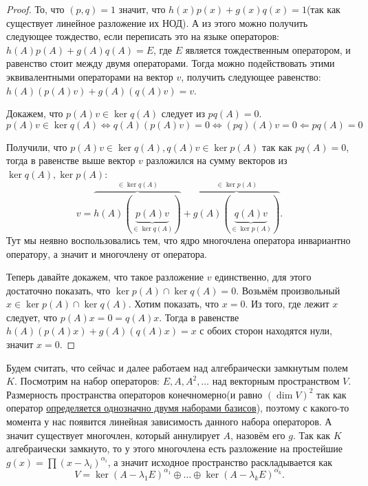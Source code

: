 \begin{proof}
    То, что $(p,q) = 1$ значит, что 
    $h(x)p(x) + g(x)q(x) = 1$(так как существует линейное разложение их НОД).
    А из этого можно получить следующее тождество, если переписать это на языке операторов:
    $h(A)p(A) + g(A) q(A) = E$, где $E$ является тождественным оператором, и равенство
    стоит между двумя операторами.
    Тогда можно подействовать этими эквивалентными операторами на вектор $v$, получить
    следующее равенство: $h(A)(p(A)v) + g(A)(q(A)v) = v$.

    Докажем, что $p(A)v\in \ker q(A)$ следует из $pq(A) = 0$.
    \[
        p(A)v\in \ker q(A) \Leftrightarrow q(A)(p(A)v) = 0 \Leftrightarrow (pq)(A)v = 0 \Leftarrow pq(A)=0
    \] 
    
    Получили, что $p(A)v\in \ker q(A), q(A)v\in \ker p(A)$ так как $pq(A)=0$,
    тогда в равенстве выше вектор $v$ разложился на сумму векторов из $\ker q(A), \ker p(A)$:
    \[
        v = 
        \overbrace{h(A)(\underbrace{p(A)v}_{\in \ker q(A)})}^{\in \ker q(A)} + 
        \overbrace{g(A)(\underbrace{q(A)v}_{\in \ker p(A)})}^{\in \ker p(A)}
    .\]
    Тут мы неявно
    воспользовались тем, что ядро многочлена оператора инвариантно оператору, а
    значит и многочлену от оператора.

    Теперь давайте докажем, что такое разложение $v$ единственно, для этого достаточно
    показать, что $\ker p(A) \cap \ker q(A) = 0$. Возьмём произвольный
    $x\in \ker p(A)\cap \ker q(A)$. Хотим показать, что $x = 0$.
    Из того, где лежит  $x$ следует, что $p(A)x = 0 = q(A)x$.
    Тогда в равенстве $h(A)(p(A)x) + g(A)(q(A)x) = x$ с обоих сторон находятся нули, 
    значит $x = 0$.
\end{proof}
Будем считать, что сейчас и далее работаем над алгебраически замкнутым полем $K$.
Посмотрим на набор операторов: $E, A, A^2, \dots$ над векторным пространством $V$.
Размерность пространства операторов конечномерно(и равно $(\dim V)^2$ так как
оператор \hyperref[thm:Линейное отображение однозначно задаётся двумя базисами]
{определяется однозначно двумя наборами базисов}), поэтому
с какого-то момента у нас появится линейная зависимость данного набора операторов.
А значит существует многочлен, который аннулирует $A$, назовём его $g$.
Так как $K$ алгебраически замкнуто, то у этого многочлена есть разложение на простейшие
$g(x) = \prod (x - \lambda_i)^{\alpha_i}$, а значит исходное пространство раскладывается как 
\[
    V = \ker (A - \lambda_1 E)^{\alpha_1} \oplus \dots \oplus \ker (A - \lambda_k E)^{\alpha_k}
.\]
